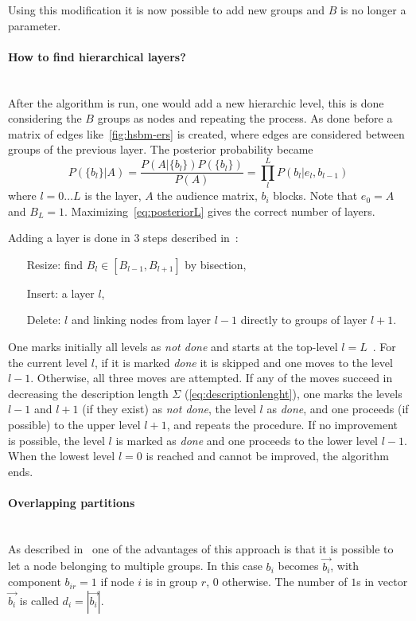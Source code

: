 Using this modification it is now possible to add new groups and $B$ is no longer a parameter.

\paragraph{How to find hierarchical layers?}\mbox{}\\
After the algorithm is run, one would add a new hierarchic level, this is done considering the $B$ groups as nodes and repeating the process.
As done before a matrix of edges like~\ref{fig:hsbm-ers} is created, where edges are considered between groups of the previous layer.
The posterior probability became
\begin{equation}\label{eq:posteriorL}
  P(\{b_l\}|A)=\frac{P(A|\{b_l\})P(\{b_l\})}{P(A)}=\prod_l^L P(b_l|e_l,b_{l-1})
\end{equation}
where $l=0\dots L$ is the layer, $A$ the audience matrix, $b_i$ blocks. Note that $e_0=A$ and $B_L=1$.
Maximizing~\ref{eq:posteriorL} gives the correct number of layers.

Adding a layer is done in 3 steps described in~\cite{peixoto2014hierarchic}:
\begin{itemize}
  \item[Resize:] find $B_l\in[B_{l-1},B_{l+1}]$ by bisection,
  \item[Insert:] a layer $l$,
  \item[Delete:] $l$ and linking nodes from layer $l-1$ directly to groups of layer
  $l+1$.
\end{itemize}
One marks initially all levels as \textit{not done} and starts at the top-level $l = L$~\cite{peixoto2014hierarchic}.
For the current level $l$, if it is marked \textit{done} it is skipped and one moves to the level $l-1$. Otherwise, all three moves are attempted. If any of the moves succeed in decreasing the description length $\Sigma$ (\ref{eq:descriptionlenght}), one marks the levels $l-1$ and $l+1$ (if they exist) as \textit{not done}, the level $l$ as \textit{done}, and one proceeds (if possible) to the upper level $l+1$, and repeats the procedure. If no improvement is possible, the level $l$ is marked as \textit{done} and one proceeds to the lower level $l-1$. When the lowest level $l=0$ is reached and cannot be improved, the algorithm ends.

\paragraph{Overlapping partitions}\mbox{}\\
As described in~\cite{peixoto2015model} one of the advantages of this approach is that it is possible to let a node belonging to multiple groups.
In this case $b_i$ becomes $\vec{b_i}$, with component $b_{ir}=1$ if node $i$ is in group $r$, $0$ otherwise. The number of $1$s in vector $\vec{b_i}$ is called
$d_i=|\vec{b_i}|$.


